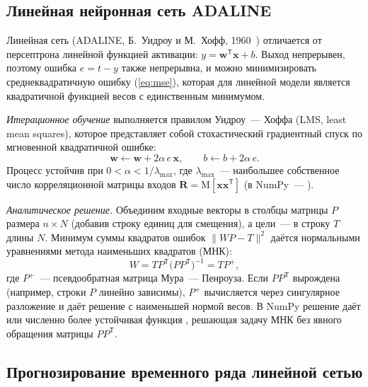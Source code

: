 \subsection{Линейная нейронная сеть ADALINE}

Линейная сеть (ADALINE, Б.~Уидроу и М.~Хофф, 1960~\cite{widrow1960}) отличается от персептрона
линейной функцией активации: $y = \mathbf{w}^{\mathsf T}\mathbf{x} + b$. Выход непрерывен, поэтому
ошибка $e = t - y$ также непрерывна, и можно минимизировать среднеквадратичную ошибку
(\ref{eq:mse}), которая для линейной модели является квадратичной функцией весов с единственным
минимумом.

\emph{Итерационное обучение} выполняется правилом Уидроу~--- Хоффа (LMS, least mean squares), которое представляет собой стохастический градиентный спуск по мгновенной
квадратичной ошибке:
\begin{equation}
\label{eq:lms}
\mathbf{w} \leftarrow \mathbf{w} + 2\alpha\, e\, \mathbf{x}, \qquad b \leftarrow b + 2\alpha\, e .
\end{equation}
Процесс устойчив при $0 < \alpha < 1/\lambda_{\max}$, где $\lambda_{\max}$~--- наибольшее собственное
число корреляционной матрицы входов $\mathbf{R} = \mathrm{M}[\mathbf{x}\mathbf{x}^{\mathsf T}]$ (в NumPy~---
).

\emph{Аналитическое решение.} Объединим входные векторы в столбцы матрицы $P$ размера $n \times N$
(добавив строку единиц для смещения), а цели~--- в строку $T$ длины $N$. Минимум суммы квадратов
ошибок $\lVert WP - T\rVert^2$ даётся нормальными уравнениями метода наименьших квадратов (МНК):
\begin{equation}
\label{eq:pinv}
W = T P^{\mathsf T}\bigl(PP^{\mathsf T}\bigr)^{-1} = T P^{+},
\end{equation}
где $P^{+}$~--- псевдообратная матрица Мура~--- Пенроуза. Если $PP^{\mathsf T}$ вырождена (например,
строки $P$ линейно зависимы), $P^{+}$ вычисляется через сингулярное разложение и даёт решение с
наименьшей нормой весов. В NumPy решение даёт  или численно более
устойчивая функция , решающая задачу МНК без явного обращения матрицы
$PP^{\mathsf T}$.

\subsection{Прогнозирование временного ряда линейной сетью}

